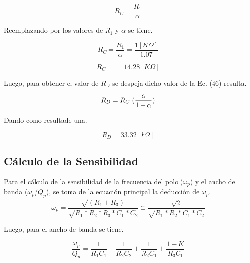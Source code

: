 \documentclass[12pt,A4paper,titlepage]{article}
\begin{document}
\begin{equation}
    R_C = \frac{R_1}{\alpha}
\end{equation}

\hspace{1mm} Reemplazando por los valores de \(R_1\) y \(\alpha\) se tiene.

\bigskip
\begin{equation}
    R_C = \frac{R_1}{\alpha} = \frac{1[K\Omega]}{0.07}
\end{equation}

\begin{equation}
    \boxed{
    R_C = = 14.28[K\Omega]
    }
\end{equation}

\bigskip
\hspace{1mm} Luego, para obtener el valor de \(R_D\) se despeja dicho valor de la Ec. (46) resulta.

\begin{equation}
    R_D = R_C \hspace{1mm} (\frac{\alpha}{1 - \alpha})
\end{equation}

\bigskip
\hspace{1mm} Dando como resultado una.

\begin{equation}
    \boxed{
        R_D = 33.32[k \Omega] 
    }   
\end{equation}

\newpage
\subsection{Cálculo de la Sensibilidad}
\hspace{1mm} Para el cálculo de la sensibilidad de la frecuencia del polo (\(\omega_p\)) y el ancho de banda (\(\omega_p/Q_p\)), se toma de la ecuación principal la deducción de \(\omega_p\).
\begin{equation}
    \omega_p=\frac{\sqrt{(R_1+R_3)}}{\sqrt{R_1*R_2*R_3*C_1*C_2}}\cong \frac{\sqrt{2}}{\sqrt{R_1*R_2*C_1*C_2}}
\end{equation}

\bigskip
\hspace{1mm} Luego, para el ancho de banda se tiene.

\bigskip
\begin{equation}
    \frac{\omega_p}{Q_p}=\frac{1}{R_1C_1}+\frac{1}{R_2C_2}+\frac{1}{R_2C_1}+\frac{1-K}{R_3C_1}
\end{equation}
\end{document}
